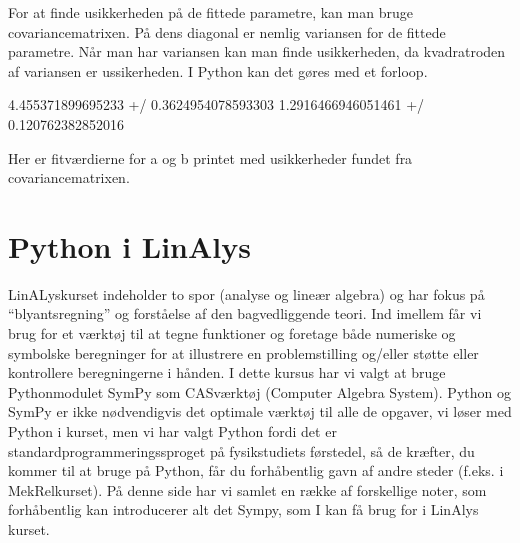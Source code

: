 \documentclass[letterpaper,10pt,english]{jupyterBook}
\begin{document}
\noindent{}

For at finde usikkerheden på de fittede parametre, kan man bruge covariance\sphinxhyphen{}matrixen. På dens diagonal er nemlig variansen for de fittede parametre. Når man har variansen kan man finde usikkerheden, da kvadratroden af variansen er ussikerheden. I Python kan det gøres med et for\sphinxhyphen{}loop.

\begin{sphinxVerbatim}[commandchars=\\\{\}]
   
      \PYG{p}{[}\PYG{p}{]}
    \PYG{p}{[}\PYG{p}{]}   
    
\end{sphinxVerbatim}

\begin{sphinxVerbatim}[commandchars=\\\{\}]
4.455371899695233  +/\PYGZhy{} 0.3624954078593303
1.2916466946051461  +/\PYGZhy{} 0.120762382852016
\end{sphinxVerbatim}

Her er fit\sphinxhyphen{}værdierne for a og b printet med usikkerheder fundet fra covariance\sphinxhyphen{}matrixen.


\chapter{Python i LinAlys}
\label{\detokenize{notebooks/sympy/Notebook1:python-i-linalys}}\label{\detokenize{notebooks/sympy/Notebook1::doc}}
LinALys\sphinxhyphen{}kurset indeholder to spor (analyse og lineær algebra) og har fokus på “blyantsregning” og forståelse af den bagvedliggende teori. Ind imellem får vi brug for et værktøj til at tegne funktioner og foretage både numeriske og symbolske beregninger for at illustrere en problemstilling og/eller støtte eller kontrollere beregningerne i hånden. I dette kursus har vi valgt at bruge Python\sphinxhyphen{}modulet SymPy som CAS\sphinxhyphen{}værktøj (Computer Algebra System). Python og SymPy er ikke nødvendigvis det optimale værktøj til alle de opgaver, vi løser med Python i kurset, men vi har valgt Python fordi det er standardprogrammeringssproget på fysikstudiets førstedel, så de kræfter, du kommer til at bruge på Python, får du forhåbentlig gavn af andre steder (f.eks. i MekRel\sphinxhyphen{}kurset). På denne side har vi samlet en række af forskellige noter, som forhåbentlig kan introducerer alt det Sympy, som I kan få brug for i LinAlys kurset.
\end{document}
